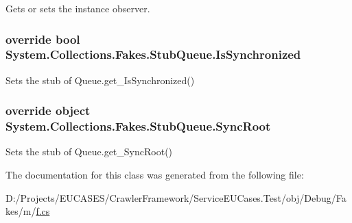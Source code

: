 Gets or sets the instance observer.

\hypertarget{class_system_1_1_collections_1_1_fakes_1_1_stub_queue_a6497c2de0251eb0619e8fbaccbae3e6a}{
\subsubsection[{Is\-Synchronized}]{\setlength{\rightskip}{0pt plus 5cm}override bool System.\-Collections.\-Fakes.\-Stub\-Queue.\-Is\-Synchronized\hspace{0.3cm}{\ttfamily [get]}}}\label{class_system_1_1_collections_1_1_fakes_1_1_stub_queue_a6497c2de0251eb0619e8fbaccbae3e6a}


Sets the stub of Queue.\-get\-\_\-\-Is\-Synchronized()

\hypertarget{class_system_1_1_collections_1_1_fakes_1_1_stub_queue_a8829920607b12f9bfe05af0cc543defb}{
\subsubsection[{Sync\-Root}]{\setlength{\rightskip}{0pt plus 5cm}override object System.\-Collections.\-Fakes.\-Stub\-Queue.\-Sync\-Root\hspace{0.3cm}{\ttfamily [get]}}}\label{class_system_1_1_collections_1_1_fakes_1_1_stub_queue_a8829920607b12f9bfe05af0cc543defb}


Sets the stub of Queue.\-get\-\_\-\-Sync\-Root()



The documentation for this class was generated from the following file\-:\begin{DoxyCompactItemize}
\item 
D\-:/\-Projects/\-E\-U\-C\-A\-S\-E\-S/\-Crawler\-Framework/\-Service\-E\-U\-Cases.\-Test/obj/\-Debug/\-Fakes/m/\hyperlink{m_2f_8cs}{f.\-cs}\end{DoxyCompactItemize}
